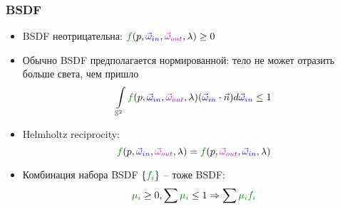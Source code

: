 \documentclass[10pt]{beamer}
\begin{document}
\begin{frame}[fragile]
\frametitle{BSDF}
\begin{itemize}
\item BSDF неотрицательна: \begin{math}{\color{green}f}(p, {\color{blue}\vec\omega_{in}}, {\color{magenta}\vec\omega_{out}}, \lambda)\geq 0\end{math}
\pause
\item Обычно BSDF предполагается нормированной: тело не может отразить больше света, чем пришло
\begin{equation*}
\int\limits_{\mathbb S^2} {\color{green}f}(p, {\color{blue}\vec\omega_{in}}, {\color{magenta}\vec\omega_{out}}, \lambda)({\color{blue}\vec\omega_{in}} \cdot \vec{n}) d{\color{blue}\vec\omega_{in}} \leq 1
\end{equation*}
\pause
\item Helmholtz reciprocity:
\begin{equation*}
{\color{green}f}(p, {\color{blue}\vec\omega_{in}}, {\color{magenta}\vec\omega_{out}}, \lambda) = {\color{green}f}(p, {\color{magenta}\vec\omega_{out}}, {\color{blue}\vec\omega_{in}}, \lambda)
\end{equation*}
\pause
\item Комбинация набора BSDF \begin{math}\{{\color{green}f_i}\}\end{math} -- тоже BSDF:
\begin{equation*}
{\color{green}\mu_i} \geq 0, \sum {\color{green}\mu_i} \leq 1 \Rightarrow \sum {\color{green}\mu_i f_i}
\end{equation*}
\end{itemize}
\end{frame}
\end{document}
